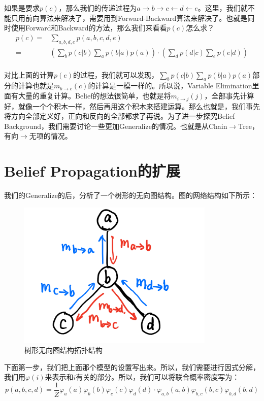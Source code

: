 \documentclass[a4paper]{article}
\begin{document}
如果是要求$p(c)$，那么我们的传递过程为$a\longrightarrow b \longrightarrow c \longleftarrow d \longleftarrow e$。这里，我们就不能只用前向算法来解决了，需要用到Forward-Backward算法来解决了。也就是同时使用Forward和Backward的方法，那么我们来看看$p(c)$怎么求？
\begin{equation}
    \begin{split}
        p(c) 
        = & \sum_{a,b,d,e}p(a,b,c,d,e) \\
        = & (\sum_b p(c|b)\sum_a p(b|a)p(a)) \cdot (\sum_d p(d|c)\sum_e p(e|d)) \\
    \end{split}
\end{equation}

对比上面的计算$p(e)$的过程，我们就可以发现，$\sum_b p(c|b)\sum_a p(b|a)p(a)$部分的计算也就是$m_{b\longrightarrow c}(c)$的计算是一模一样的。所以说，Variable Elimination里面有大量的重复计算。Belief的想法很简单，也就是将$m_{i\longrightarrow j}(j)$，全部事先计算好，就像一个个积木一样，然后再用这个积木来搭建运算。那么也就是，我们事先将方向全部定义好，正向和反向的全部都求了再说。为了进一步探究Belief Background，我们需要讨论一些更加Generalize的情况。也就是从Chain$\longrightarrow$Tree，有向$\longrightarrow$无项的情况。

\section{Belief Propagation的扩展}
我们的Generalize的后，分析了一个树形的无向图结构。图的网络结构如下所示：
\begin{figure}[H]
    \centering
    \includegraphics[width=.35\textwidth]{微信图片_20191208145754.png}
    \caption{树形无向图结构拓扑结构}
    \label{fig:my_label_1}
\end{figure}

下面第一步，我们把上面那个模型的设置写出来。所以，我们需要进行因式分解，我们用$\varphi(i)$来表示和$i$有关的部分。所以，我们可以将联合概率密度写为：
\begin{equation}
    p(a,b,c,d) = \frac{1}{Z} \varphi_a(a)\varphi_b(b)\varphi_c(c)\varphi_d(d)\cdot \varphi_{a,b}(a,b)\varphi_{b,c}(b,c)\varphi_{b,d}(b,d)
\end{equation}
\end{document}
